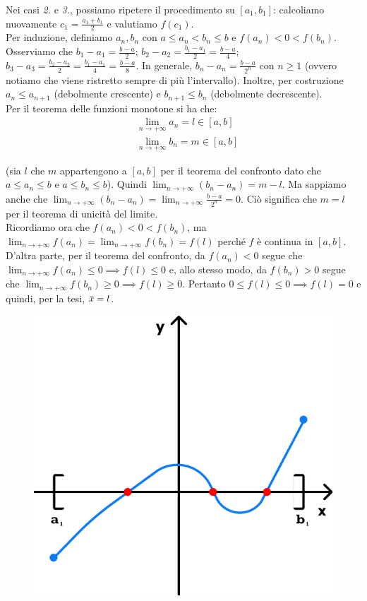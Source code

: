 \documentclass{article}
\begin{document}
\noindent Nei casi \textit{2.} e \textit{3.}, possiamo ripetere il procedimento su $[a_1, b_1]$: calcoliamo nuovamente $c_1 = \frac{a_1 + b_1}{2}$ e valutiamo $f(c_1)$.\\
Per induzione, definiamo $a_n, b_n$ con $a \leq a_n < b_n \leq b$ e $f(a_n) < 0 < f(b_n)$. Osserviamo che $b_1 - a_1 = \frac{b - a}{2}$; $b_2 - a_2 = \frac{b_1 - a_1}{2} = \frac{b - a}{4}$; $b_3 - a_3 = \frac{b_2 - a_2}{2} = \frac{b_1 - a_1}{4} = \frac{b - a}{8}$. In generale, $b_n - a_n = \frac{b - a}{2^n}$ con $n \geq 1$ (ovvero notiamo che viene ristretto sempre di più l'intervallo). Inoltre, per costruzione $a_n \leq a_{n + 1}$ (debolmente crescente) e $b_{n + 1} \leq b_n$ (debolmente decrescente).\\
Per il teorema delle funzioni monotone si ha che:
\begin{align*}
  & \lim_{n \to +\infty} a_n = l \in [a, b] \\
  & \lim_{n \to +\infty} b_n = m \in [a, b]
\end{align*}

\noindent (sia $l$ che $m$ appartengono a $[a, b]$ per il teorema del confronto dato che $a \leq a_n \leq b$ e $a \leq b_n \leq b$). Quindi $\lim_{n \to +\infty} (b_n - a_n) = m - l$. Ma sappiamo anche che $\lim_{n \to +\infty} (b_n - a_n) = \lim_{n \to +\infty} \frac{b - a}{2^n} = 0$. Ciò significa che $m = l$ per il teorema di unicità del limite.\\
Ricordiamo ora che $f(a_n) < 0 < f(b_n)$, ma $\lim_{n \to +\infty} f(a_n) = \lim_{n \to +\infty} f(b_n) = f(l)$ perché $f$ è continua in $[a, b]$.\\
D'altra parte, per il teorema del confronto, da $f(a_n) < 0$ segue che $\lim_{n \to +\infty} f(a_n) \leq 0 \implies f(l) \leq 0$ e, allo stesso modo, da $f(b_n) > 0$ segue che $\lim_{n \to +\infty} f(b_n) \geq 0 \implies f(l) \geq 0$. Pertanto $0 \leq f(l) \leq 0 \implies f(l) = 0$ e quindi, per la tesi, $\Bar{x} = l$.\\

\begin{figure}
\includegraphics[width=0.9\linewidth]{./images/bolzanoThm.pdf}
\end{figure}
\end{document}
